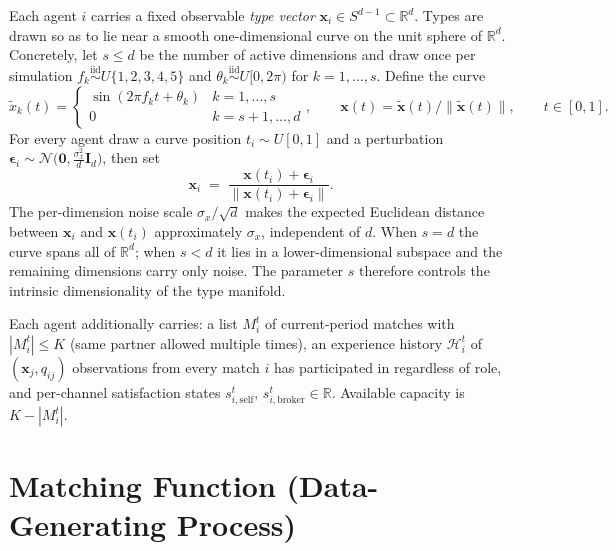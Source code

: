 \documentclass[11pt]{article}
\newcommand{\x}{\mathbf{x}}
\newcommand{\Hist}{\mathcal{H}}
\newcommand{\R}{\mathbb{R}}
\newcommand{\self}{\mathrm{self}}
\newcommand{\brk}{\mathrm{broker}}
\begin{document}
Each agent $i$ carries a fixed observable \emph{type vector} $\x_i \in S^{d-1}\subset\R^d$. Types are drawn so as to lie near a smooth one-dimensional curve on the unit sphere of $\R^d$. Concretely, let $s\le d$ be the number of active dimensions and draw once per simulation $f_k\overset{\text{iid}}{\sim}U\{1,2,3,4,5\}$ and $\theta_k\overset{\text{iid}}{\sim}U[0,2\pi)$ for $k=1,\ldots,s$. Define the curve
\begin{equation}
\tilde{x}_k(t) =
\begin{cases}
\sin(2\pi f_k t + \theta_k) & k=1,\ldots,s\\
0 & k=s+1,\ldots,d
\end{cases},\qquad
\x(t) = \tilde{\x}(t)/\|\tilde{\x}(t)\|,\qquad t \in [0,1].
\label{eq:curve}
\end{equation}
For every agent draw a curve position $t_i \sim U[0,1]$ and a perturbation $\boldsymbol\epsilon_i \sim \mathcal{N}\bigl(\mathbf{0},\tfrac{\sigma_x^2}{d}\mathbf{I}_d\bigr)$, then set
\begin{equation}
\x_i \;=\; \frac{\x(t_i) + \boldsymbol\epsilon_i}{\|\x(t_i) + \boldsymbol\epsilon_i\|}.
\label{eq:agent-type}
\end{equation}
The per-dimension noise scale $\sigma_x/\sqrt{d}$ makes the expected Euclidean distance between $\x_i$ and $\x(t_i)$ approximately $\sigma_x$, independent of $d$. When $s=d$ the curve spans all of $\R^d$; when $s<d$ it lies in a lower-dimensional subspace and the remaining dimensions carry only noise. The parameter $s$ therefore controls the intrinsic dimensionality of the type manifold.

Each agent additionally carries: a list $M_i^t$ of current-period matches with $|M_i^t|\le K$ (same partner allowed multiple times), an experience history $\Hist_i^t$ of $(\x_j,q_{ij})$ observations from every match $i$ has participated in regardless of role, and per-channel satisfaction states $s_{i,\self}^t,\, s_{i,\brk}^t \in \R$. Available capacity is $K-|M_i^t|$.

\section{Matching Function (Data-Generating Process)}\label{sec:matching}
\end{document}
